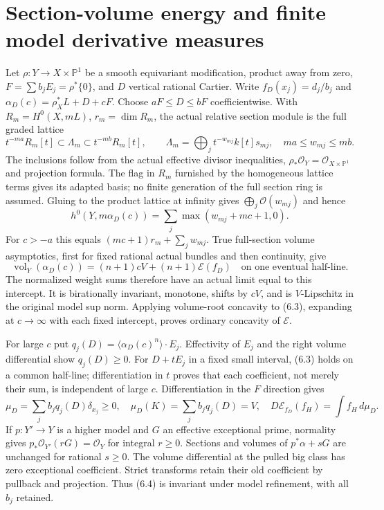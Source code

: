 \documentclass[10pt]{article}
\newcommand{\vol}{\operatorname{vol}}
\newcommand{\OO}{\mathcal O}
\begin{document}
\section{Section-volume energy and finite model derivative measures}
Let $\rho:Y\to X\times\mathbb P^1$ be a smooth equivariant modification,
product away from zero, $F=\sum b_jE_j=\rho^*\{0\}$, and $D$ vertical rational
Cartier. Write $f_D(x_j)=d_j/b_j$ and
$\alpha_D(c)=\rho_X^*L+D+cF$. Choose $aF\leq D\leq bF$ coefficientwise.
With $R_m=H^0(X,mL)$, $r_m=\dim R_m$, the actual relative section module is
the full graded lattice
\[
 t^{-ma}R_m[t]\subset\Lambda_m\subset t^{-mb}R_m[t],\qquad
 \Lambda_m=\bigoplus_jt^{-w_{mj}}k[t]s_{mj},\quad ma\leq w_{mj}\leq mb.
                                                               \tag{6.1}
\]
The inclusions follow from the actual effective divisor inequalities,
$\rho_*\OO_Y=\OO_{X\times\mathbb P^1}$ and projection formula. The flag in
$R_m$ furnished by the homogeneous lattice terms gives its adapted basis;
no finite generation of the full section ring is assumed. Gluing to the
product lattice at infinity gives $\bigoplus_j\OO(w_{mj})$ and hence
\[
 h^0(Y,m\alpha_D(c))=\sum_j\max(w_{mj}+mc+1,0).      \tag{6.2}
\]
For $c>-a$ this equals $(mc+1)r_m+\sum_jw_{mj}$. True full-section volume
asymptotics, first for fixed rational actual bundles and then continuity, give
\[
 \vol_Y(\alpha_D(c))=(n+1)cV+(n+1)\mathscr E(f_D)
 \quad\text{on one eventual half-line}.              \tag{6.3}
\]
The normalized weight sums therefore have an actual limit equal to this
intercept. It is birationally invariant, monotone, shifts by $cV$, and is
$V$-Lipschitz in the original model sup norm. Applying volume-root concavity
to (6.3), expanding at $c\to\infty$ with each fixed intercept, proves
ordinary concavity of $\mathscr E$.

For large $c$ put $q_j(D)=\langle\alpha_D(c)^n\rangle\cdot E_j$.
Effectivity of $E_j$ and the right volume differential show $q_j(D)\geq0$.
For $D+tE_j$ in a fixed small interval, (6.3) holds on a common half-line;
differentiation in $t$ proves that each coefficient, not merely their sum,
is independent of large $c$. Differentiation in the $F$ direction gives
\[
 \mu_D=\sum_jb_jq_j(D)\delta_{x_j}\geq0,
 \quad\mu_D(K)=\sum_jb_jq_j(D)=V,
 \quad D\mathscr E_{f_D}(f_H)=\int f_H\,d\mu_D.        \tag{6.4}
\]
If $p:Y'\to Y$ is a higher model and $G$ an effective exceptional prime,
normality gives $p_*\OO_{Y'}(rG)=\OO_Y$ for integral $r\geq0$. Sections and
volumes of $p^*\alpha+sG$ are unchanged for rational $s\geq0$. The volume
differential at the pulled big class has zero exceptional coefficient.
Strict transforms retain their old coefficient by pullback and projection.
Thus (6.4) is invariant under model refinement, with all $b_j$ retained.
\end{document}
